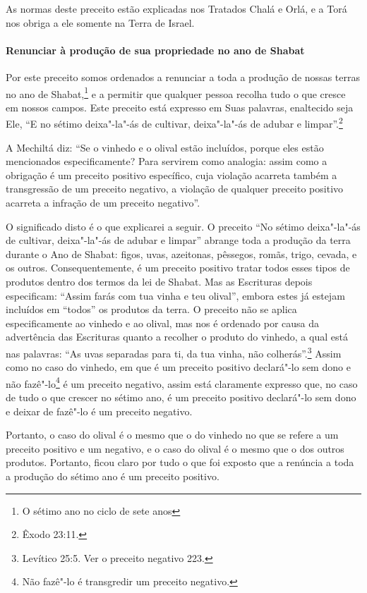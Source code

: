 \begin{multicols}{2}
As normas deste preceito estão explicadas nos Tratados Chalá\starr{} e Orlá\starr, e a
Torá\starr{} nos obriga a ele somente na Terra de Israel.

\paragraph{Renunciar à produção de sua propriedade no ano de Shabat}

Por este preceito somos ordenados a renunciar a toda a produção de
nossas terras no ano de Shabat,\footnote{O sétimo ano no ciclo de sete anos} e a permitir que
qualquer pessoa recolha tudo o que cresce em nossos campos. Este
preceito está expresso em Suas palavras, enaltecido seja Ele, ``E no
sétimo deixa"-la"-ás de cultivar, deixa"-la"-ás de adubar e limpar''.\footnote{Êxodo
23:11.}

A Mechiltá\starr{} diz: ``Se o vinhedo e o olival estão incluídos, porque eles
estão mencionados especificamente? Para servirem como analogia: assim
como a obrigação é um preceito positivo específico, cuja violação
acarreta também a transgressão de um preceito negativo, a violação de
qualquer preceito positivo acarreta a infração de um preceito
negativo''.

O significado disto é o que explicarei a seguir. O preceito ``No sétimo
deixa"-la"-ás de cultivar, deixa"-la"-ás de adubar e limpar'' abrange toda a
produção da terra durante o Ano de Shabat: figos, uvas, azeitonas,
pêssegos, romãs, trigo, cevada, e os outros. Consequentemente, é um
preceito positivo tratar todos esses tipos de produtos dentro dos
termos da lei de Shabat. Mas as Escrituras depois especificam: ``Assim
farás com tua vinha e teu olival'', embora estes já estejam incluídos
em ``todos'' os produtos da terra. O preceito não se aplica
especificamente ao vinhedo e ao olival, mas nos é ordenado por causa
da advertência das Escrituras quanto a recolher o produto do vinhedo, a
qual está nas palavras: ``As uvas separadas para ti, da tua vinha, não
colherás''.\footnote{Levítico 25:5. Ver o preceito negativo 223.} Assim como no caso do vinhedo, em que é
um preceito positivo declará"-lo sem dono e não
fazê"-lo\footnote{Não fazê"-lo é transgredir um preceito negativo.} é um preceito negativo, assim está claramente expresso que, no caso de tudo o que crescer no sétimo ano, é um preceito positivo declará"-lo sem dono e deixar de fazê"-lo é um preceito negativo.

Portanto, o caso do olival é o mesmo que o do vinhedo no que se refere a
um preceito positivo e um negativo, e o caso do olival é o mesmo que o
dos outros produtos. Portanto, ficou claro por tudo o que foi exposto
que a renúncia a toda a produção do sétimo ano é um preceito positivo.


\end{multicols}
